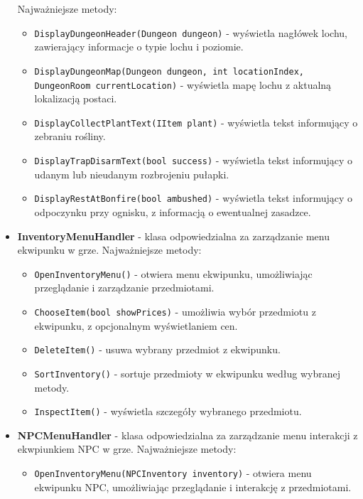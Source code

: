 \begin{itemize}
            Najważniejsze metody:
                \begin{itemize}
                    \item \texttt{DisplayDungeonHeader(Dungeon dungeon)} - wyświetla nagłówek lochu, zawierający informacje o typie lochu i poziomie.
                    \item \texttt{DisplayDungeonMap(Dungeon dungeon, int locationIndex, DungeonRoom currentLocation)} - wyświetla mapę lochu z aktualną lokalizacją postaci.
                    \item \texttt{DisplayCollectPlantText(IItem plant)} - wyświetla tekst informujący o zebraniu rośliny.
                    \item \texttt{DisplayTrapDisarmText(bool success)} - wyświetla tekst informujący o udanym lub nieudanym rozbrojeniu pułapki.
                    \item \texttt{DisplayRestAtBonfire(bool ambushed)} - wyświetla tekst informujący o odpoczynku przy ognisku, z informacją o ewentualnej zasadzce.
                \end{itemize}
                \item \textbf{InventoryMenuHandler} - klasa odpowiedzialna za zarządzanie menu ekwipunku w grze. 
                Najważniejsze metody:
                    \begin{itemize}
                        \item \texttt{OpenInventoryMenu()} - otwiera menu ekwipunku, umożliwiając przeglądanie i zarządzanie przedmiotami.
                        \item \texttt{ChooseItem(bool showPrices)} - umożliwia wybór przedmiotu z ekwipunku, z opcjonalnym wyświetlaniem cen.
                        \item \texttt{DeleteItem()} - usuwa wybrany przedmiot z ekwipunku.
                        \item \texttt{SortInventory()} - sortuje przedmioty w ekwipunku według wybranej metody.
                        \item \texttt{InspectItem()} - wyświetla szczegóły wybranego przedmiotu.
                    \end{itemize}
                \item \textbf{NPCMenuHandler} - klasa odpowiedzialna za zarządzanie menu interakcji z ekwpiunkiem NPC w grze. 
                Najważniejsze metody:
                    \begin{itemize}
                        \item \texttt{OpenInventoryMenu(NPCInventory inventory)} - otwiera menu ekwipunku NPC, umożliwiając przeglądanie i interakcję z przedmiotami.

\end{itemize}
\end{itemize}
